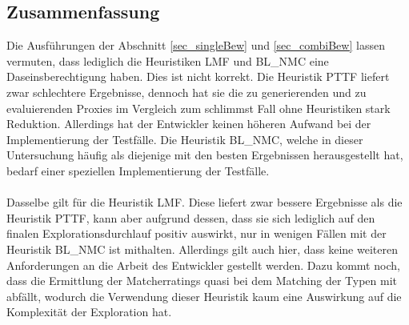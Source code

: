 \subsection{Zusammenfassung}
Die Ausführungen der Abschnitt \ref{sec_singleBew} und \ref{sec_combiBew} lassen vermuten, dass lediglich die Heuristiken LMF und BL\_NMC eine Daseinsberechtigung haben. Dies ist nicht korrekt. Die Heuristik PTTF liefert zwar schlechtere Ergebnisse, dennoch hat sie die zu generierenden und zu evaluierenden Proxies im Vergleich zum schlimmst Fall ohne Heuristiken stark Reduktion. Allerdings hat der Entwickler keinen höheren Aufwand bei der Implementierung der Testfälle. Die Heuristik BL\_NMC, welche in dieser Untersuchung häufig als diejenige mit den besten Ergebnissen herausgestellt hat, bedarf einer speziellen Implementierung der Testfälle.
\\\\
Dasselbe gilt für die Heuristik LMF. Diese liefert zwar bessere Ergebnisse als die Heuristik PTTF, kann aber aufgrund dessen, dass sie sich lediglich auf den finalen Explorationsdurchlauf positiv auswirkt, nur in wenigen Fällen mit der Heuristik BL\_NMC ist mithalten. Allerdings gilt auch hier, dass keine weiteren Anforderungen an die Arbeit des Entwickler gestellt werden. Dazu kommt noch, dass die Ermittlung der Matcherratings quasi bei dem Matching der Typen mit abfällt, wodurch die Verwendung dieser Heuristik kaum eine Auswirkung auf die Komplexität der Exploration hat.

